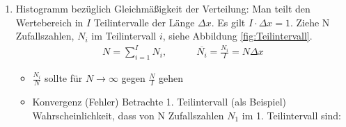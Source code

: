 \documentclass[12pt]{article}
\begin{document}
\begin{enumerate}
\item Histogramm bezüglich Gleichmäßigkeit der Verteilung: Man teilt den Wertebereich in $I$ Teilintervalle der Länge $\Delta x$. Es gilt $I \cdot \Delta x = 1$.  Ziehe N Zufallszahlen, $N_i$ im Teilintervall $i$, siehe Abbildung \ref{fig:Teilintervall}.
\begin{align}
N = \sum _{i=1}^I N_i, \quad \quad \quad \overline{N_i} = \frac{N_i}{I}= N \Delta x
\end{align}
\begin{itemize}
\item $\frac{N_i}{N}$ sollte für $N \to \infty $ gegen $\frac{N}{I}$ gehen
\item Konvergenz (Fehler) %
Betrachte 1. Teilintervall (als Beispiel) Wahrscheinlichkeit, dass von N Zufallszahlen $N_1$ im 1. Teilintervall sind:


\end{itemize}
\end{enumerate}
\end{document}
